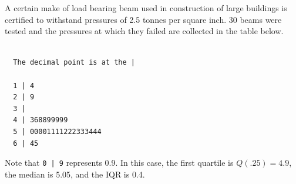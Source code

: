 \documentclass{examsetup}\usepackage[]{graphicx}\usepackage[]{color}
\makeatletter
\newenvironment{kframe}{%
 \def\at@end@of@kframe{}%
 \ifinner\ifhmode%
  \def\at@end@of@kframe{\end{minipage}}%
  \begin{minipage}{\columnwidth}%
 \fi\fi%
 \def\FrameCommand##1{\hskip\@totalleftmargin \hskip-\fboxsep
 \colorbox{shadecolor}{##1}\hskip-\fboxsep
     \hskip-\linewidth \hskip-\@totalleftmargin \hskip\columnwidth}%
 \MakeFramed {\advance\hsize-\width
   \@totalleftmargin\z@ \linewidth\hsize
   \@setminipage}}%
 {\par\unskip\endMakeFramed%
 \at@end@of@kframe}
\newenvironment{knitrout}{}{} %
\makeatother
\begin{document}
\begin{questions}
\question 



A certain make of load bearing beam used in construction of large buildings is certified to withstand pressures of 2.5 tonnes per square inch.
30 beams were tested and the pressures at which they failed are collected in the table below.

\begin{knitrout}
\color{fgcolor}\begin{kframe}
\begin{verbatim}

  The decimal point is at the |

  1 | 4
  2 | 9
  3 | 
  4 | 368899999
  5 | 00001111222333444
  6 | 45
\end{verbatim}
\end{kframe}
\end{knitrout}

Note that \verb!0 | 9! represents 0.9. In this case, the first quartile is $Q(.25) = 4.9$, the median is 5.05, and the IQR is 0.4.



\end{questions}
\end{document}
